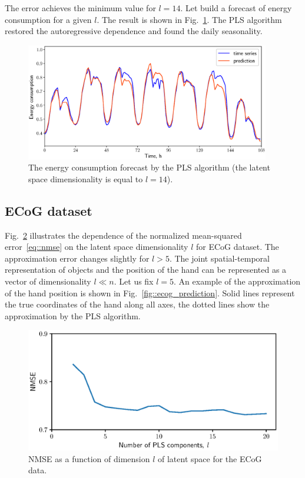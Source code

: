 \documentclass[12pt,twoside]{article}
\begin{document}
The error achieves the minimum value for $l=14$. 
Let build a forecast of energy consumption for a given $l$. 
The result is shown in Fig.~\ref{fig::energy_prediction}. 
The PLS algorithm restored the autoregressive dependence and found the daily seasonality.

\begin{figure}[!h]
	\centering
	\includegraphics[width=0.95\textwidth]{figs/energy_prediction}
	\caption{The energy consumption forecast by the PLS algorithm (the latent space dimensionality is equal to $l=14$).}
	\label{fig::energy_prediction}
\end{figure}

\subsection{ECoG dataset}
Fig.~\ref{fig::ecog_n_comp} illustrates the dependence of the normalized mean-squared error~\eqref{eq::nmse} on the latent space dimensionality $l$ for ECoG dataset. 
The approximation error changes slightly for $l > 5$.
The joint spatial-temporal representation of objects and the position of the hand can be represented as a vector of dimensionality $l \ll n$.
Let us fix $l = 5$. 
An example of the approximation of the hand position is shown in Fig.~\ref{fig::ecog_prediction}. 
Solid lines represent the true coordinates of the hand along all axes, the dotted lines show the approximation by the PLS algorithm.
 
\begin{figure}[!h]
	\centering
	\includegraphics[width=0.75\linewidth]{figs/ecog_n_comp}	
	\caption{NMSE as a function of dimension $l$ of latent space for the ECoG data.}
	\label{fig::ecog_n_comp}
\end{figure}
\end{document}
